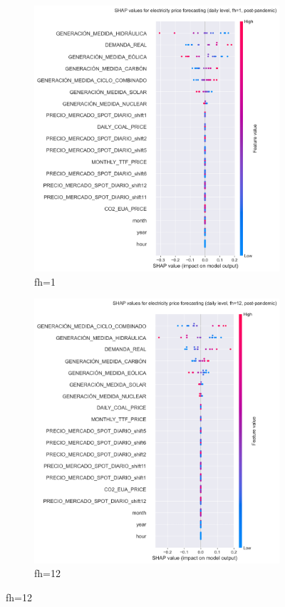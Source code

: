 \begin{figure}[H]
\centering
    \begin{subfigure}{.45\textwidth}
        \centering
        \includegraphics[width=1\linewidth]{images/analysis/shap-monthly-1}
        \caption{fh=1}
    \end{subfigure}
    \begin{subfigure}{.45\textwidth}
        \centering
        \includegraphics[width=1\linewidth]{images/analysis/shap-monthly-12}
        \caption{fh=12}
    \end{subfigure}


\end{figure}
